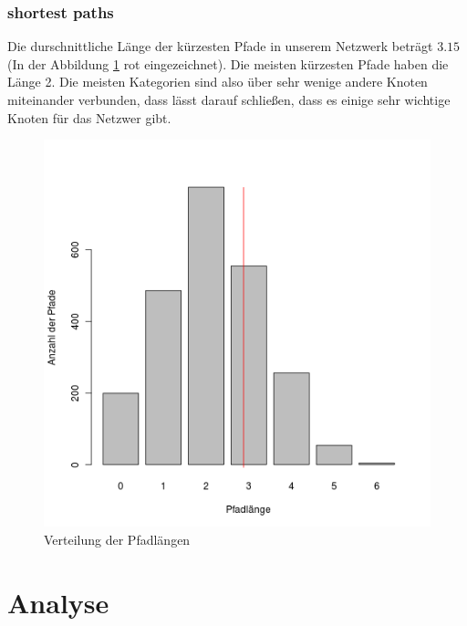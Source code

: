\documentclass{acm_proc_article-sp}
\begin{document}
\subsubsection{shortest paths}
Die durschnittliche Länge der kürzesten Pfade in unserem Netzwerk beträgt $3.15$(In der Abbildung \ref{fig:paths} rot eingezeichnet). Die meisten kürzesten Pfade haben die Länge 2. Die meisten Kategorien sind also über sehr wenige andere Knoten miteinander verbunden, dass lässt darauf schließen, dass es einige sehr wichtige Knoten für das Netzwer gibt. 
\begin{figure}[H]
\centering
\includegraphics[scale=0.55]{../visualization/shortest_path_hist.png}
\caption{Verteilung der Pfadlängen}
\label{fig:paths}
\end{figure}
\newpage
\section{Analyse}
\end{document}
